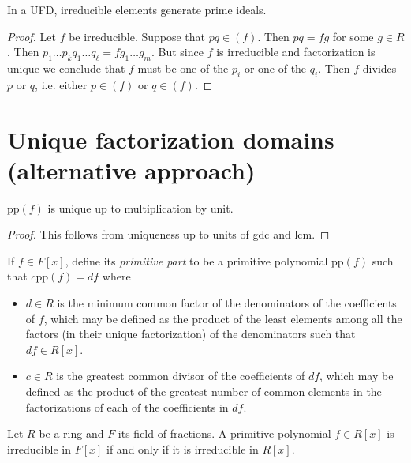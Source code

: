 \begin{lemma}
\label{lemma-in-UFD-irreducible-elements-generate-prime-ideals}
In a UFD, irreducible elements generate prime ideals.
\end{lemma}

\begin{proof}
Let $f$ be irreducible. Suppose that $pq\in(f)$. Then $pq=fg$ for some  $g\in
R$. Then $p_1\ldots p_kq_1\ldots q_\ell=fg_1\ldots g_m$. But since $f$ is
irreducible and factorization is unique we conclude that $f$ must be one of the
 $p_i$ or one of the $q_i$. Then $f$ divides $p$ or $q$, i.e. either $p\in(f)$
or $q\in(f)$.
\end{proof}

\section{Unique factorization domains (alternative approach)}
\label{section-UFD-alternative}


\begin{lemma}
\label{lemma-primitive-part-unique-up-to-unit}
$\text{pp}(f)$ is unique up to multiplication by unit.
\end{lemma}

\begin{proof}
This follows from uniqueness up to units of gdc and lcm.
\end{proof}

\begin{definition}
\label{definition-primitive-part}
If $f\in F[x]$, define its {\it primitive part} to be a primitive polynomial
$\text{pp}(f)$ such that $c\text{pp}(f)=df$ where
\begin{itemize}
\item $d\in R$ is the minimum common
factor of the denominators of the coefficients of $f$, which may be defined as
the product of the least elements among all the factors (in their unique
factorization) of the denominators such that $df \in R[x]$.
\item $c\in R$ is the greatest common divisor of the coefficients of $df$, which
may be defined as the product of the greatest number of common elements in the
factorizations of each of the coefficients in $df$.
\end{itemize}
\end{definition}

\begin{lemma}[Gauss]
\label{lemma-Gauss}
Let $R$ be a ring and $F$ its field of fractions. A primitive polynomial $f\in
R[x]$ is irreducible in $F[x]$ if and only if it is irreducible in $R[x]$.
\end{lemma}

